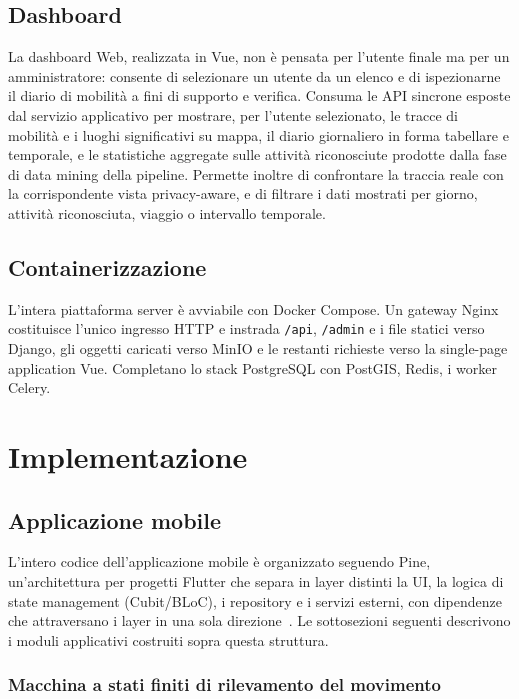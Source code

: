 \documentclass[conference]{IEEEtran}
\begin{document}
\subsection{Dashboard}

La dashboard Web, realizzata in Vue, non è pensata per l'utente
finale ma per un amministratore: consente di selezionare un utente da
un elenco e di ispezionarne il diario di mobilità a fini di supporto e
verifica. Consuma le API sincrone esposte dal servizio applicativo per
mostrare, per l'utente selezionato, le tracce di mobilità e i luoghi
significativi su mappa, il diario giornaliero in forma tabellare e
temporale, e le statistiche aggregate sulle attività riconosciute
prodotte dalla fase di data mining della pipeline. Permette inoltre
di confrontare la traccia reale con la corrispondente vista
privacy-aware, e di filtrare i dati mostrati per giorno, attività
riconosciuta, viaggio o intervallo temporale.

\subsection{Containerizzazione}

L'intera piattaforma server è avviabile con Docker Compose. Un gateway
Nginx costituisce l'unico ingresso HTTP e instrada \texttt{/api},
\texttt{/admin} e i file statici verso Django, gli oggetti caricati verso
MinIO e le restanti richieste verso la single-page application Vue.
Completano lo stack PostgreSQL con PostGIS, Redis, i worker Celery.

\section{Implementazione}
\label{sec:implementation}

\subsection{Applicazione mobile}

L'intero codice dell'applicazione mobile è organizzato seguendo Pine,
un'architettura per progetti Flutter che separa in layer
distinti la UI, la logica di state management (Cubit/BLoC), i repository
e i servizi esterni, con dipendenze che attraversano i layer in una
sola direzione~\cite{pine-architecture}. Le sottosezioni seguenti
descrivono i moduli applicativi costruiti sopra questa struttura.

\subsubsection{Macchina a stati finiti di rilevamento del movimento}
\end{document}
